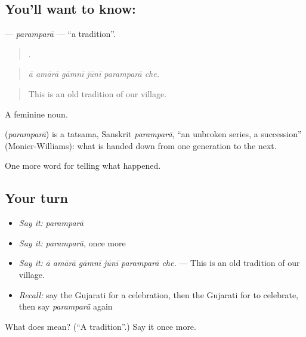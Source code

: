 \subsection*{You'll want to know: }
\textbf{} — \emph{paramparā} — \textquotedblleft{}a tradition\textquotedblright{}.

\begin{quote}
     .
\end{quote}

\begin{quote}
\emph{ā amārā gāmnī jūnī paramparā che.}
\end{quote}

\begin{quote}
This is an old tradition of our village.
\end{quote}

A feminine noun.

\begin{cousinweb}
\textbf{} (\emph{paramparā}) is a tatsama, Sanskrit \emph{paramparā}, \textquotedblleft{}an unbroken series, a succession\textquotedblright{} (Monier-Williams): what is handed down from one generation to the next.
\end{cousinweb}

\begin{grammarlens}[title={What you've built}]
One more word for telling what happened.
\end{grammarlens}

\subsection*{Your turn}
\begin{itemize}
\raggedright
  \item \emph{Say it:} \emph{paramparā}
  \item \emph{Say it:} \emph{paramparā}, once more
  \item \emph{Say it:} \emph{ā amārā gāmnī jūnī paramparā che.} — This is an old tradition of our village.
  \item \emph{Recall:} say the Gujarati for a celebration, then the Gujarati for to celebrate, then say \emph{paramparā} again
\end{itemize}

\begin{tcolorbox}[breakable,colback=teal!4,colframe=teal!35!black,title={Before you move on}]
What does  mean? (\textquotedblleft{}A tradition\textquotedblright{}.) Say it once more.
\end{tcolorbox}
